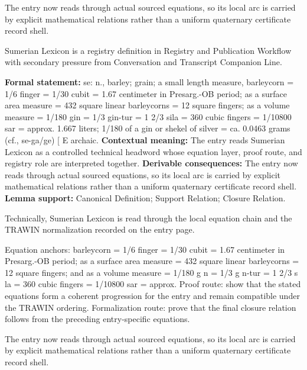 The entry now reads through actual sourced equations, so its local arc is carried by explicit mathematical relations rather than a uniform quaternary certificate record shell.
\clearpage


\begingroup\small
{}
Sumerian Lexicon is a registry definition in Registry and Publication Workflow with secondary pressure from Conversation and Transcript Companion Line.

\begingroup\footnotesize\setlength{\emergencystretch}{3em}\sloppy
\textbf{Formal statement:} se: n., barley; grain; a small length measure, barleycorn = 1/6 finger = 1/30 cubit = 1.67 centimeter in Presarg.-OB period; as a surface area measure = 432 square linear barleycorns = 12 square fingers; as a volume measure = 1/180 gin = 1/3 gin-tur = 1 2/3 sila = 360 cubic fingers = 1/10800 sar = approx. 1.667 liters; 1/180 of a gin or shekel of silver = ca. 0.0463 grams (cf., se-ga/ge) [ E archaic. \textbf{Contextual meaning:} The entry reads Sumerian Lexicon as a controlled technical headword whose equation layer, proof route, and registry role are interpreted together. \textbf{Derivable consequences:} The entry now reads through actual sourced equations, so its local arc is carried by explicit mathematical relations rather than a uniform quaternary certificate record shell. \textbf{Lemma support:} Canonical Definition; Support Relation; Closure Relation.\par
\endgroup

Technically, Sumerian Lexicon is read through the local equation chain and the TRAWIN normalization recorded on the entry page.

Equation anchors: barleycorn = 1/6 finger = 1/30 cubit = 1.67 centimeter in Presarg.-OB period; as a surface area measure = 432 square linear barleycorns = 12 square fingers; and as a volume measure = 1/180 g n = 1/3 g n-tur = 1 2/3 s la = 360 cubic fingers = 1/10800 sar = approx. Proof route: show that the stated equations form a coherent progression for the entry and remain compatible under the TRAWIN ordering. Formalization route: prove that the final closure relation follows from the preceding entry-specific equations.

The entry now reads through actual sourced equations, so its local arc is carried by explicit mathematical relations rather than a uniform quaternary certificate record shell.
\endgroup

